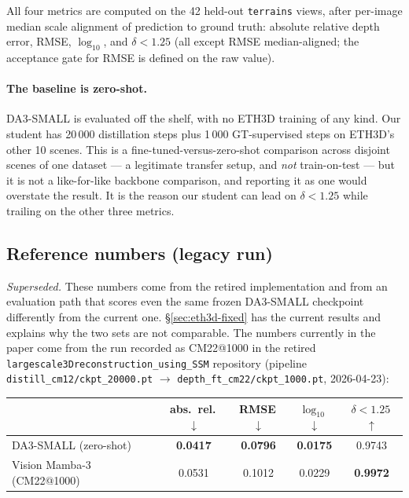 \documentclass[11pt,a4paper]{article}
\begin{document}
All four metrics are computed on the 42 held-out \texttt{terrains} views, after
per-image median scale alignment of prediction to ground truth: absolute
relative depth error, RMSE, $\log_{10}$, and $\delta{<}1.25$ (all except RMSE
median-aligned; the acceptance gate for RMSE is defined on the raw value).

\paragraph{The baseline is zero-shot.} DA3-SMALL is evaluated off the shelf,
with no ETH3D training of any kind. Our student has 20\,000 distillation steps
plus 1\,000 GT-supervised steps on ETH3D's other 10 scenes. This is a
fine-tuned-versus-zero-shot comparison across disjoint scenes of one dataset ---
a legitimate transfer setup, and \emph{not} train-on-test --- but it is not a
like-for-like backbone comparison, and reporting it as one would overstate the
result. It is the reason our student can lead on $\delta{<}1.25$ while trailing
on the other three metrics.

\subsection{Reference numbers (legacy run)}
\label{sec:eth3d-depth-legacy}


\emph{Superseded.} These numbers come from the retired implementation and from an evaluation
path that scores even the same frozen DA3-SMALL checkpoint differently from the current one.
\S\ref{sec:eth3d-fixed} has the current results and explains why the two sets are not
comparable.
The numbers currently in the paper come from the run recorded as CM22@1000 in
the retired \texttt{largescale3Dreconstruction\_\allowbreak{}using\_\allowbreak{}SSM} repository
(pipeline \texttt{distill\_\allowbreak{}cm12/\allowbreak{}ckpt\_\allowbreak{}20000.pt} $\rightarrow$
\texttt{depth\_\allowbreak{}ft\_\allowbreak{}cm22/\allowbreak{}ckpt\_\allowbreak{}1000.pt}, 2026-04-23):

\begin{center}
\begin{tabular}{lcccc}
\toprule
 & abs.\ rel.\,$\downarrow$ & RMSE\,$\downarrow$ & $\log_{10}$\,$\downarrow$ & $\delta{<}1.25$\,$\uparrow$ \\
\midrule
DA3-SMALL (zero-shot)     & \textbf{0.0417} & \textbf{0.0796} & \textbf{0.0175} & 0.9743 \\
Vision Mamba-3 (CM22@1000) & 0.0531 & 0.1012 & 0.0229 & \textbf{0.9972} \\
\bottomrule
\end{tabular}
\end{center}
\end{document}
